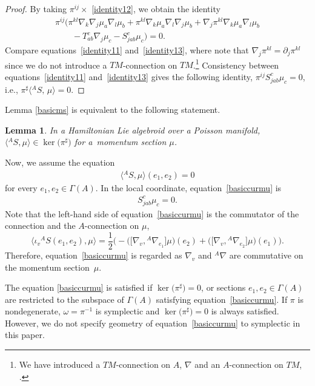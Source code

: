 \documentclass[10pt,a4paper]{amsart}
\numberwithin{equation}{section}
\newtheorem{Lemma}[Theorem]{Lemma}
\newcommand{\bracket}[2]{\langle #1,\,#2\rangle}
\newcommand{\nablabas}{{{}^A \nabla}^{\mathrm{bas}}}
\newcommand{\anabla}{{{}^A \nabla}}
\begin{document}
\begin{proof}
By taking $\pi^{ij} \times$ \eqref{identity12},
we obtain the identity
\begin{gather}
 \pi^{ij}\bigl(\pi^{kl} \nabla_k \nabla_j \mu_a \nabla_l \mu_b
+ \pi^{kl} \nabla_k \mu_a \nabla_l \nabla_j \mu_b
+ \nabla_j \pi^{kl} \nabla_k \mu_a \nabla_l \mu_b\nonumber\\
\qquad
{}- T_{ab}^c \nabla_j \mu_c
- S_{jab}^c \mu_c\bigr) =0.
\label{identity13}
\end{gather}
Compare equations~\eqref{identity11} and~\eqref{identity13},
where note that $\nabla_j \pi^{kl} = \partial_j \pi^{kl}$
since we do not introduce a $TM$-connection on $TM$.\footnote{We have introduced a $TM$-connection on $A$, $\nabla$ and
an $A$-connection on $TM$, \smash{$\anabla = \nablabas$}.}
Consistency between equations~\eqref{identity11} and~\eqref{identity13}
gives the following identity,
$\pi^{ij} S_{jab}^c \mu_c =0$,
i.e.,
$ \pi^{\sharp} \bracket{{}^AS}{\mu} =0$.
\end{proof}

Lemma \ref{basicms} is equivalent to the following statement.
\begin{Lemma}\label{basicms2}
In a Hamiltonian Lie algebroid over a Poisson manifold,
$\bigl\langle{}^A S,\mu\bigr\rangle \in \ker\bigl(\pi^{\sharp}\bigr)$
for a~momentum section $\mu$.
\end{Lemma}
Now, we assume the equation
\begin{gather}
\bigl\langle{}^A S,\mu\bigr\rangle(e_1, e_2)
= 0
\label{basiccurmu}
\end{gather}
for every $e_1, e_2 \in \Gamma(A)$.
In the local coordinate, equation~\eqref{basiccurmu} is
\begin{gather}
S_{jab}^c \mu_c =0.
\label{basiccurmu2}
\end{gather}
Note that the left-hand side of equation~\eqref{basiccurmu} is
the commutator of the connection and the $A$-connection on $\mu$,
\[%
\bigl\langle\iota_v {}^A S(e_1, e_2),\mu\bigr\rangle =
\frac{1}{2} \bigl(- \bigl(\bigl[\nabla_{v}, \anabla_{e_1}\bigr] \mu\bigr)(e_2)
+ \bigl(\bigl[\nabla_{v}, \anabla_{e_2}\bigr] \mu\bigr)(e_1)\bigr).
\]
Therefore, equation~\eqref{basiccurmu} is regarded as
$\nabla_{v}$ and $\anabla$ are commutative on the momentum section~$\mu$.

The equation \eqref{basiccurmu} is satisfied if $\ker\bigl(\pi^{\sharp}\bigr)= 0$, or
sections $e_1, e_2 \in \Gamma(A)$ are restricted to the subspace of $\Gamma(A)$
satisfying equation~\eqref{basiccurmu}.
If $\pi$ is nondegenerate, $\omega = \pi^{-1}$ is symplectic and
$\ker\bigl(\pi^{\sharp}\bigr)= 0$ is always satisfied.
However, we do not specify geometry of equation~\eqref{basiccurmu} to
symplectic in this paper.
\end{document}
